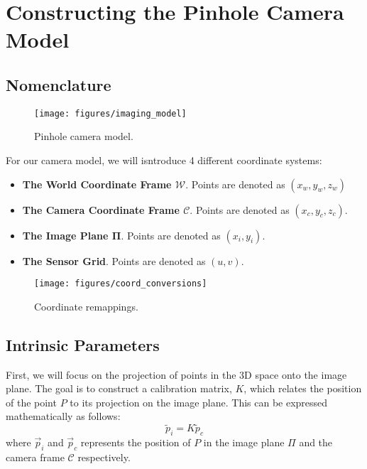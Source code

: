 \section{Constructing the Pinhole Camera Model}

\subsection{Nomenclature}
\begin{figure}[H]
    \centering
    \texttt{[image: figures/imaging\_model]}
    \caption{Pinhole camera model.}
\end{figure}

For our camera model, we will isntroduce 4 different coordinate systems:
\begin{itemize}[leftmargin=!, itemindent=-4ex]
    \item\textbf{The World Coordinate Frame $\boldsymbol{\mathcal{W}}$}. Points are denoted as $\left(x_w, y_w, z_w\right)$
    \item\textbf{The Camera Coordinate Frame $\boldsymbol{\mathcal{C}}$}. Points are denoted as $\left(x_c, y_c, z_c\right)$.
    \item\textbf{The Image Plane $\boldsymbol{\Pi}$}. Points are denoted as $\left(x_i, y_i\right)$.
    \item\textbf{The Sensor Grid}. Points are denoted as $\left(u, v\right)$.
\end{itemize}




\begin{figure}[H]
    \centering
    \texttt{[image: figures/coord\_conversions]}
    \caption{Coordinate remappings.}
\end{figure}


\subsection{Intrinsic Parameters} \label{sec:intrinsics}

First, we will focus on the projection of points in the 3D space onto the image plane. The goal is to construct a calibration matrix, $K$, which relates the position of the point $P$ to its projection on the image plane. This can be expressed mathematically as follows:
\begin{equation} \label{eq:pi}
    \widetilde{p}_i =  K\widetilde{p}_c
\end{equation}
where $\vec{p}_i$ and $\vec{p}_c$ represents the position of $P$ in the image plane $\Pi$ and the camera frame $\mathcal{C}$ respectively.

